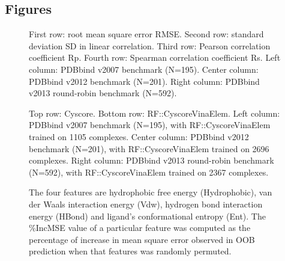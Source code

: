 \documentclass[linenumbers]{bmcart}
\begin{document}
\begin{backmatter}


\section*{Figures}

\begin{figure}[h]
\caption{ First row: root mean square error RMSE. Second row: standard deviation SD in linear correlation. Third row: Pearson correlation coefficient Rp. Fourth row: Spearman correlation coefficient Rs. Left column: PDBbind v2007 benchmark (N=195). Center column: PDBbind v2012 benchmark (N=201). Right column: PDBbind v2013 round-robin benchmark (N=592).}
\label{fig:stat}
\end{figure}

\begin{figure}[h]
\caption{ Top row: Cyscore. Bottom row: RF::CyscoreVinaElem. Left column: PDBbind v2007 benchmark (N=195), with RF::CyscoreVinaElem trained on 1105 complexes. Center column: PDBbind v2012 benchmark (N=201), with RF::CyscoreVinaElem trained on 2696 complexes. Right column: PDBbind v2013 round-robin benchmark (N=592), with RF::CyscoreVinaElem trained on 2367 complexes.}
\label{fig:cor}
\end{figure}

\begin{figure}[h]
\caption{ The four features are hydrophobic free energy (Hydrophobic), van der Waals interaction energy (Vdw), hydrogen bond interaction energy (HBond) and ligand's conformational entropy (Ent). The \%IncMSE value of a particular feature was computed as the percentage of increase in mean square error observed in OOB prediction when that features was randomly permuted.}
\label{fig:varimp}
\end{figure}


\end{backmatter}
\end{document}
